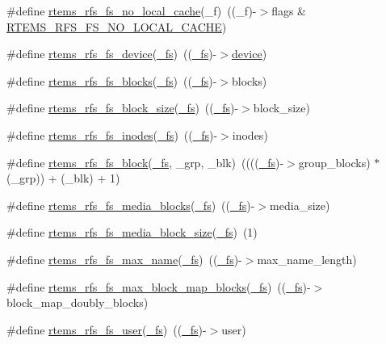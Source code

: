 \begin{DoxyCompactItemize}
\item 
\#define \mbox{\hyperlink{rtems-rfs-file-system_8h_ab34fb5ec272a7c163861a3e78ef272ef}{rtems\+\_\+rfs\+\_\+fs\+\_\+no\+\_\+local\+\_\+cache}}(\+\_\+f)~((\+\_\+f)-\/$>$flags \& \mbox{\hyperlink{rtems-rfs-file-system_8h_a4c09dc40dd68bed53db53bc05224e754}{R\+T\+E\+M\+S\+\_\+\+R\+F\+S\+\_\+\+F\+S\+\_\+\+N\+O\+\_\+\+L\+O\+C\+A\+L\+\_\+\+C\+A\+C\+HE}})
\item 
\#define \mbox{\hyperlink{rtems-rfs-file-system_8h_a695fd90ac521035644782df512e5b9ba}{rtems\+\_\+rfs\+\_\+fs\+\_\+device}}(\mbox{\hyperlink{struct__fs}{\+\_\+fs}})~((\mbox{\hyperlink{struct__fs}{\+\_\+fs}})-\/$>$\mbox{\hyperlink{structdevice}{device}})
\item 
\#define \mbox{\hyperlink{rtems-rfs-file-system_8h_abdcb6e27e194a3e74e9b199e7dfce0e2}{rtems\+\_\+rfs\+\_\+fs\+\_\+blocks}}(\mbox{\hyperlink{struct__fs}{\+\_\+fs}})~((\mbox{\hyperlink{struct__fs}{\+\_\+fs}})-\/$>$blocks)
\item 
\#define \mbox{\hyperlink{rtems-rfs-file-system_8h_a0662f514ed0e284e3802c83bca653c95}{rtems\+\_\+rfs\+\_\+fs\+\_\+block\+\_\+size}}(\mbox{\hyperlink{struct__fs}{\+\_\+fs}})~((\mbox{\hyperlink{struct__fs}{\+\_\+fs}})-\/$>$block\+\_\+size)
\item 
\#define \mbox{\hyperlink{rtems-rfs-file-system_8h_a876d1ab071a182aeb6cc74bf16c562c7}{rtems\+\_\+rfs\+\_\+fs\+\_\+inodes}}(\mbox{\hyperlink{struct__fs}{\+\_\+fs}})~((\mbox{\hyperlink{struct__fs}{\+\_\+fs}})-\/$>$inodes)
\item 
\#define \mbox{\hyperlink{rtems-rfs-file-system_8h_a172f7506949f8e81ba35c9b9cce16594}{rtems\+\_\+rfs\+\_\+fs\+\_\+block}}(\mbox{\hyperlink{struct__fs}{\+\_\+fs}},  \+\_\+grp,  \+\_\+blk)~((((\mbox{\hyperlink{struct__fs}{\+\_\+fs}})-\/$>$group\+\_\+blocks) $\ast$ (\+\_\+grp)) + (\+\_\+blk) + 1)
\item 
\#define \mbox{\hyperlink{rtems-rfs-file-system_8h_a7627e2a11f8c4dbdec5daeb96687e815}{rtems\+\_\+rfs\+\_\+fs\+\_\+media\+\_\+blocks}}(\mbox{\hyperlink{struct__fs}{\+\_\+fs}})~((\mbox{\hyperlink{struct__fs}{\+\_\+fs}})-\/$>$media\+\_\+size)
\item 
\#define \mbox{\hyperlink{rtems-rfs-file-system_8h_a2e87a9ba4d97f0c4887c4f7669e132e3}{rtems\+\_\+rfs\+\_\+fs\+\_\+media\+\_\+block\+\_\+size}}(\mbox{\hyperlink{struct__fs}{\+\_\+fs}})~(1)
\item 
\#define \mbox{\hyperlink{rtems-rfs-file-system_8h_adcf995ca24dfef0d825b9d1fc080a806}{rtems\+\_\+rfs\+\_\+fs\+\_\+max\+\_\+name}}(\mbox{\hyperlink{struct__fs}{\+\_\+fs}})~((\mbox{\hyperlink{struct__fs}{\+\_\+fs}})-\/$>$max\+\_\+name\+\_\+length)
\item 
\#define \mbox{\hyperlink{rtems-rfs-file-system_8h_ab5a01fc4db6765150f69b2f9ce58c7b3}{rtems\+\_\+rfs\+\_\+fs\+\_\+max\+\_\+block\+\_\+map\+\_\+blocks}}(\mbox{\hyperlink{struct__fs}{\+\_\+fs}})~((\mbox{\hyperlink{struct__fs}{\+\_\+fs}})-\/$>$block\+\_\+map\+\_\+doubly\+\_\+blocks)
\item 
\#define \mbox{\hyperlink{rtems-rfs-file-system_8h_ab76356f0ad0de1274bc4996618c00175}{rtems\+\_\+rfs\+\_\+fs\+\_\+user}}(\mbox{\hyperlink{struct__fs}{\+\_\+fs}})~((\mbox{\hyperlink{struct__fs}{\+\_\+fs}})-\/$>$user)
\end{DoxyCompactItemize}
